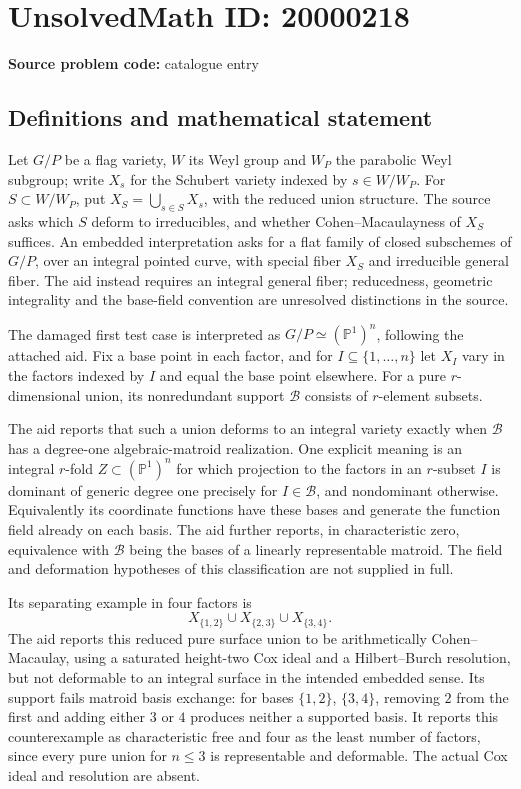 \documentclass[11pt]{article}
\newcommand{\PP}{\mathbb{P}}
\begin{document}
\section*{UnsolvedMath ID: 20000218}
\textbf{Source problem code:} catalogue entry
\subsection{Definitions and mathematical statement}
Let \(G/P\) be a flag variety, \(W\) its Weyl group and \(W_P\) the parabolic Weyl subgroup; write \(X_s\) for the Schubert variety indexed by \(s\in W/W_P\). For \(S\subset W/W_P\), put \(X_S=\bigcup_{s\in S}X_s\), with the reduced union structure. The source asks which \(S\) deform to irreducibles, and whether Cohen--Macaulayness of \(X_S\) suffices. An embedded interpretation asks for a flat family of closed subschemes of \(G/P\), over an integral pointed curve, with special fiber \(X_S\) and irreducible general fiber. The aid instead requires an integral general fiber; reducedness, geometric integrality and the base-field convention are unresolved distinctions in the source.

The damaged first test case is interpreted as \(G/P\simeq(\PP^1)^n\), following the attached aid. Fix a base point in each factor, and for \(I\subseteq\{1,\ldots,n\}\) let \(X_I\) vary in the factors indexed by \(I\) and equal the base point elsewhere. For a pure \(r\)-dimensional union, its nonredundant support \(\mathcal B\) consists of \(r\)-element subsets.

The aid reports that such a union deforms to an integral variety exactly when \(\mathcal B\) has a degree-one algebraic-matroid realization. One explicit meaning is an integral \(r\)-fold \(Z\subset(\PP^1)^n\) for which projection to the factors in an \(r\)-subset \(I\) is dominant of generic degree one precisely for \(I\in\mathcal B\), and nondominant otherwise. Equivalently its coordinate functions have these bases and generate the function field already on each basis. The aid further reports, in characteristic zero, equivalence with \(\mathcal B\) being the bases of a linearly representable matroid. The field and deformation hypotheses of this classification are not supplied in full.

Its separating example in four factors is
\[
X_{\{1,2\}}\cup X_{\{2,3\}}\cup X_{\{3,4\}}.
\]
The aid reports this reduced pure surface union to be arithmetically Cohen--Macaulay, using a saturated height-two Cox ideal and a Hilbert--Burch resolution, but not deformable to an integral surface in the intended embedded sense. Its support fails matroid basis exchange: for bases \(\{1,2\}\), \(\{3,4\}\), removing \(2\) from the first and adding either \(3\) or \(4\) produces neither a supported basis. It reports this counterexample as characteristic free and four as the least number of factors, since every pure union for \(n\leq3\) is representable and deformable. The actual Cox ideal and resolution are absent.
\end{document}
